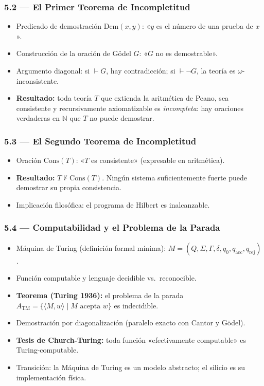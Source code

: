 \documentclass[11pt, letterpaper]{article}
\begin{document}
\subsubsection{5.2 — El Primer Teorema de Incompletitud}
\begin{itemize}
  \item Predicado de demostración $\text{Dem}(x,y)$: «$y$ es el número de una prueba de $x$».
  \item Construcción de la oración de Gödel $G$: «$G$ no es demostrable».
  \item Argumento diagonal: si $\vdash G$, hay contradicción; si $\vdash\neg G$, la teoría es $\omega$-inconsistente.
  \item \textbf{Resultado:} toda teoría $T$ que extienda la aritmética de Peano, sea consistente y recursivamente axiomatizable es \emph{incompleta}: hay oraciones verdaderas en $\mathbb{N}$ que $T$ no puede demostrar.
\end{itemize}

\subsubsection{5.3 — El Segundo Teorema de Incompletitud}
\begin{itemize}
  \item Oración $\text{Cons}(T)$: «$T$ es consistente» (expresable en aritmética).
  \item \textbf{Resultado:} $T\not\vdash\text{Cons}(T)$. Ningún sistema suficientemente fuerte puede demostrar su propia consistencia.
  \item Implicación filosófica: el programa de Hilbert es inalcanzable.
\end{itemize}

\subsubsection{5.4 — Computabilidad y el Problema de la Parada}
\begin{itemize}
  \item Máquina de Turing (definición formal mínima): $M=(Q,\Sigma,\Gamma,\delta,q_0,q_{\text{acc}},q_{\text{rej}})$.
  \item Función computable y lenguaje decidible vs.\ reconocible.
  \item \textbf{Teorema (Turing 1936):} el problema de la parada $A_{\text{TM}}=\{\langle M,w\rangle\mid M\text{ acepta }w\}$ es indecidible.
  \item Demostración por diagonalización (paralelo exacto con Cantor y Gödel).
  \item \textbf{Tesis de Church-Turing:} toda función «efectivamente computable» es Turing-computable.
  \item Transición: la Máquina de Turing es un modelo abstracto; el silicio es su implementación física.
\end{itemize}
\end{document}
